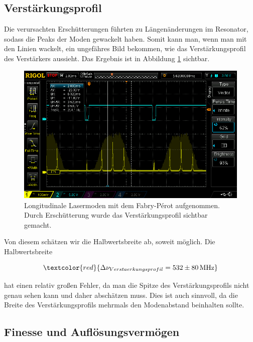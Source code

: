 \subsection*{Verstärkungsprofil}

Die verursachten Erschütterungen führten zu Längenänderungen im Resonator, sodass die Peaks der Moden gewackelt haben.
Somit kann man, wenn man mit den Linien wackelt, ein ungefähres Bild bekommen, wie das Verstärkungsprofil
des Verstärkers aussieht. Das Ergebnis ist in Abbildung \ref{bild:Verstaerkung} sichtbar.

\begin{figure}[h]
    \centering
    \includegraphics[width = \linewidth]{Bilder/Auswertung/FabryPerotVerst.png}
    \caption{Longitudinale Lasermoden mit dem Fabry-Pérot aufgenommen. Durch Erschütterung wurde das Verstärkungsprofil sichtbar gemacht.}
    \label{bild:Verstaerkung}
\end{figure}

Von diesem schätzen wir die Halbwertsbreite ab, soweit möglich. Die Halbwertsbreite 

\begin{equation}
    \textcolor{red}{\Delta\nu_{Verstaerkungsprofil} = 532 \pm 80 \, \mathrm{MHz}}
\end{equation}

hat einen relativ großen Fehler, da man die Spitze des Verstärkungsprofils nicht genau sehen kann und daher abschätzen muss.
Dies ist auch sinnvoll, da die Breite des Verstärkungsprofils mehrmals den Modenabstand beinhalten sollte.


\subsection*{Finesse und Auflösungsvermögen}

